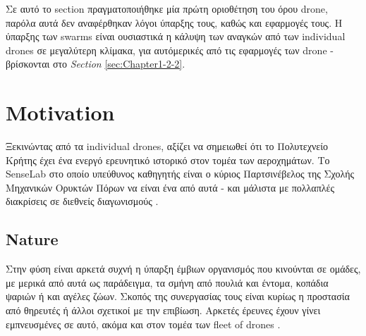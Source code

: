 Σε αυτό το section πραγματοποιήθηκε μία πρώτη οριοθέτηση του όρου drone, παρόλα αυτά
δεν αναφέρθηκαν λόγοι ύπαρξης τους, καθώς και εφαρμογές τους.  Η ύπαρξης των swarms είναι ουσιαστικά η 
κάλυψη των αναγκών από των individual drones σε μεγαλύτερη κλίμακα, για αυτό\udot μερικές από τις εφαρμογές των drone - βρίσκονται
στο \emph{Section} \ref{sec:Chapter1-2-2}.


\section{Motivation} \label{sec:Chapter1-2} 
Ξεκινώντας από τα individual drones, αξίζει να σημειωθεί ότι το Πολυτεχνείο Κρήτης έχει ένα ενεργό
ερευνητικό ιστορικό στον τομέα των αεροχημάτων. Το SenseLab στο οποίο υπεύθυνος καθηγητής είναι ο κύριος
Παρτσινέβελος της Σχολής Μηχανικών Ορυκτών Πόρων να είναι ένα από αυτά -
και μάλιστα με πολλαπλές διακρίσεις  σε διεθνείς διαγωνισμούς \cite{senselab-demo} \cite{senselab-site}. 

\subsection{Nature} \label{sec:Chapter1-2-1}
Στην φύση είναι αρκετά συχνή η ύπαρξη έμβιων οργανισμός που κινούνται σε ομάδες, με μερικά από αυτά ως παράδειγμα, τα σμήνη από πουλιά και
έντομα, κοπάδια ψαριών ή και αγέλες ζώων. Σκοπός της συνεργασίας τους είναι κυρίως η προστασία από θηρευτές ή άλλοι σχετικοί με την επιβίωση.
Αρκετές έρευνες έχουν γίνει εμπνευ\-σμένες σε αυτό, ακόμα και στον τομέα των fleet of drones
\cite{research-on-drone-swarms-move-like-animals} \cite{research-on-drone-swarms-move-like-animals-like-documentary} \cite{swarm-of-drones}.
  
